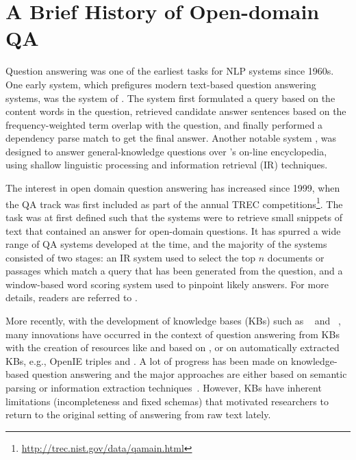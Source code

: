 
\section{A Brief History of Open-domain QA}
\label{sec:openqa-rw}

Question answering was one of the earliest tasks for NLP systems since 1960s. One early system, which prefigures modern text-based question answering systems, was the  system of \cite{simmons1964indexing}. The system first formulated a query based on the content words in the question, retrieved candidate answer sentences based on the frequency-weighted term overlap with the question, and finally performed a dependency parse match to get the final answer. Another notable system  \cite{kupiec1993murax}, was designed to answer general-knowledge questions over 's on-line encyclopedia, using shallow linguistic processing and information retrieval (IR) techniques.

The interest in open domain question answering has increased since 1999, when the QA track was first included as part of the annual TREC competitions\footnote{\url{http://trec.nist.gov/data/qamain.html}}. The task was at first defined such that the systems were to retrieve small snippets of text that contained an answer for open-domain questions. It has spurred a wide range of QA systems developed at the time, and the majority of the systems consisted of two stages: an IR system used to select the top $n$ documents or passages which match a query that has been generated from the question, and a window-based word scoring system used to pinpoint likely answers. For more details, readers are referred to \cite{voorhees1999trec,moldovan2000structure}.

More recently, with the development of knowledge bases (KBs) such as ~\cite{bollacker2008freebase} and ~\cite{auer2007dbpedia}, many innovations have occurred in the context of question answering from KBs with the creation of resources like  \cite{berant2013semantic} and  \cite{bordes2015large} based on , or on automatically extracted KBs, e.g., OpenIE triples and  \cite{fader2014open}. A lot of progress has been made on knowledge-based question answering and the major approaches are either based on semantic parsing or information extraction techniques~\cite{yao2014freebase}. However, KBs have inherent limitations (incompleteness and fixed schemas) that motivated researchers to return to the original setting of answering from raw text lately.

